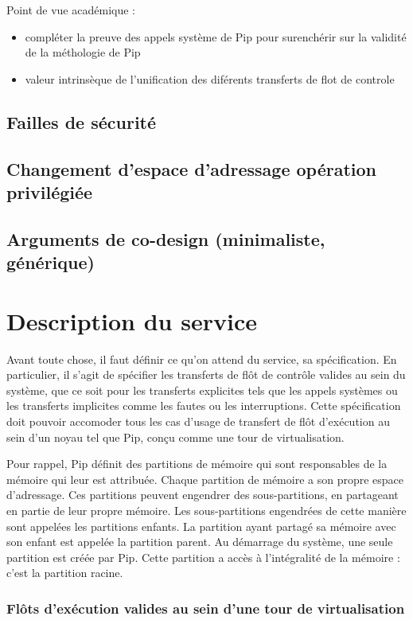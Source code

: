 		Point de vue académique :
		\begin{itemize}
			\item compléter la preuve des appels système de Pip pour surenchérir sur la validité de la méthologie de Pip
			\item valeur intrinsèque de l'unification des diférents transferts de flot de controle
		\end{itemize}
		\subsection{Failles de sécurité}
		\subsection{Changement d'espace d'adressage opération privilégiée}
		\subsection{Arguments de co-design (minimaliste, générique)}
			

	\section{Description du service}

	Avant toute chose, il faut définir ce qu'on attend du service, sa spécification. En particulier, il s'agit de spécifier les transferts de flôt de contrôle valides au sein du système, que ce soit pour les transferts explicites tels que les appels systèmes ou les transferts implicites comme les fautes ou les interruptions. Cette spécification doit pouvoir accomoder tous les cas d'usage de transfert de flôt d'exécution au sein d'un noyau tel que Pip, conçu comme une tour de virtualisation.
	
	Pour rappel, Pip définit des partitions de mémoire qui sont responsables de la mémoire qui leur est attribuée. Chaque partition de mémoire a son propre espace d'adressage. Ces partitions peuvent engendrer des sous-partitions, en partageant en partie de leur propre mémoire. Les sous-partitions engendrées de cette manière sont appelées les partitions enfants. La partition ayant partagé sa mémoire avec son enfant est appelée la partition parent. Au démarrage du système, une seule partition est créée par Pip. Cette partition a accès à l'intégralité de la mémoire : c'est la partition racine.

	\subsubsection{Flôts d'exécution valides au sein d'une tour de virtualisation}

